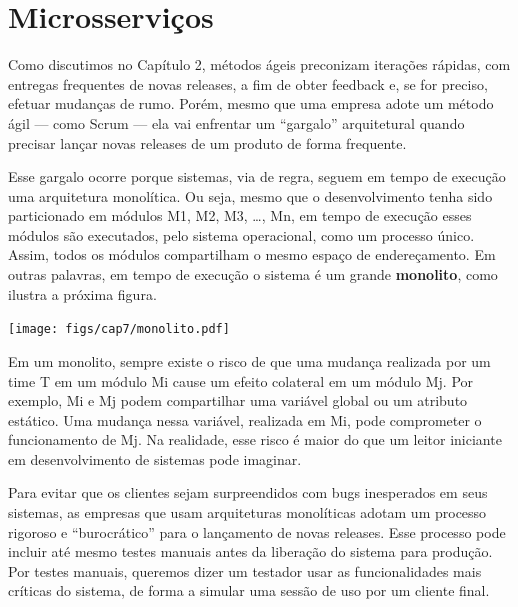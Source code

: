 \documentclass[
  11pt,
  twoside]{book}
\let\origfigure\figure
\let\endorigfigure\endfigure
\renewenvironment{figure}[1][2] {
    \expandafter\origfigure\expandafter[!h]
} {
    \endorigfigure
}
\begin{document}
\hypertarget{microsserviuxe7os}{%
\section{Microsserviços}\label{microsserviuxe7os}}

 

Como discutimos no Capítulo 2, métodos ágeis preconizam iterações
rápidas, com entregas frequentes de novas releases, a fim de obter
feedback e, se for preciso, efetuar mudanças de rumo. Porém, mesmo que
uma empresa adote um método ágil --- como Scrum --- ela vai enfrentar um
``gargalo'' arquitetural quando precisar lançar novas releases de um
produto de forma frequente.

  Esse gargalo ocorre
porque sistemas, via de regra, seguem em tempo de execução uma
arquitetura monolítica. Ou seja, mesmo que o desenvolvimento tenha sido
particionado em módulos M1, M2, M3, \ldots, Mn, em tempo de execução
esses módulos são executados, pelo sistema operacional, como um processo
único. Assim, todos os módulos compartilham o mesmo espaço de
endereçamento. Em outras palavras, em tempo de execução o sistema é um
grande \textbf{monolito}, como ilustra a próxima figura.

\begin{figure}
\centering
\texttt{[image: figs/cap7/monolito.pdf]}
\caption{Monolito com nove módulos. Em tempo de execução, o sistema
executa como um único processo, representado pelo quadrado que delimita
os 9 módulos.}
\end{figure}

Em um monolito, sempre existe o risco de que uma mudança realizada por
um time T em um módulo Mi cause um efeito colateral em um módulo Mj. Por
exemplo, Mi e Mj podem compartilhar uma variável global ou um atributo
estático. Uma mudança nessa variável, realizada em Mi, pode comprometer
o funcionamento de Mj. Na realidade, esse risco é maior do que um leitor
iniciante em desenvolvimento de sistemas pode imaginar.

Para evitar que os clientes sejam surpreendidos com bugs inesperados em
seus sistemas, as empresas que usam arquiteturas monolíticas adotam um
processo rigoroso e ``burocrático'' para o lançamento de novas releases.
Esse processo pode incluir até mesmo testes manuais antes da liberação
do sistema para produção. Por testes manuais, queremos dizer um testador
usar as funcionalidades mais críticas do sistema, de forma a simular uma
sessão de uso por um cliente final.
\end{document}
